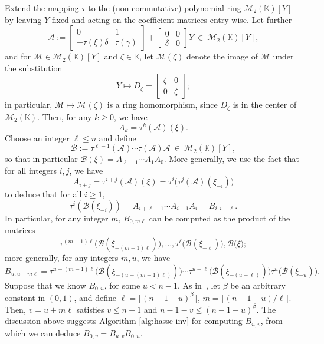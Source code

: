 \documentclass[12pt]{article}
\theoremstyle{plain}
\theoremstyle{definition}
\def\K{\ensuremath{\mathbb{K}}}
\begin{document}
Extend the mapping $\tau$ to the (non-commutative) polynomial ring
$\mathscr{M}_2(\K)[Y]$ by leaving $Y$ fixed and acting on the
coefficient matrices entry-wise.  Let further
\[
\mathcal{A} := 
\begin{bmatrix}
0 & 1 \\
-\tau(\xi)\delta & \tau(\gamma)
\end{bmatrix}
+
\begin{bmatrix}
0 & 0 \\
\delta & 0
\end{bmatrix} Y ~ \in ~ \mathscr{M}_2(\K)[Y],
\]
and for $\mathcal{M} \in \mathscr{M}_2(\K)[Y]$ and $\zeta \in \K$, let $\mathcal{M}(\zeta)$ 
denote the image of $\mathcal{M}$ under the substitution 
\[Y \longmapsto 
D_\zeta=\begin{bmatrix}
	\zeta & 0 \\
	0 & \zeta
\end{bmatrix};
\]
in particular, $\mathcal{M} \mapsto \mathcal{M}(\zeta)$ is a ring
homomorphism, since $D_\zeta$ is in the center of $\mathscr{M}_2(\K)$.
Then, for any $k \ge 0$, we have $$A_k = \tau^{k}(\mathcal{A})(\xi).$$
Choose an integer $\ell \le n$ and define
\[\mathcal{B} := \tau^{\ell-1}(\mathcal{A}) \cdots \tau(\mathcal{A}) \mathcal{A}  ~ \in ~ \mathscr{M}_2(\K)[Y],\]
so that in particular
$\mathcal{B}(\xi) = A_{\ell-1} \cdots A_1 A_0.$ More generally, 
we use the fact that for all integers $i, j$, we have
\[A_{i + j} = \tau^{i + j}(\mathcal{A})(\xi) = \tau^i\big(\tau^j(\mathcal{A})( 
\xi_{-i})\big)\]
to deduce that  for all $i \ge 1$,
\[\tau^{i}(\mathcal{B}( \xi_{-i})) = A_{i + \ell-1} \cdots A_{i + 1}A_{i} = B_{i,i+\ell}.\]
In particular, for any integer $m$, $B_{0,m\ell}$ can be computed as the product of the  matrices
\[
\tau^{(m-1) \ell}\big(\mathcal{B} ( \xi_{-(m-1)\ell} ) \big), \dots, 
\tau^{\ell}\big(\mathcal{B} ( \xi_{-\ell}) \big), \mathcal{B} \big(\xi\big);
\]
more generally, for any integers $m,u$, we have 
\[
B_{u,u+m\ell}=
\tau^{u+(m-1) \ell}\big(\mathcal{B} ( \xi_{-(u+(m-1) \ell)}) \big) \cdots
\tau^{u+\ell}\big(\mathcal{B} ( \xi_{-(u+\ell)}) \big)
\tau^{u}\big(\mathcal{B} ( \xi_{-u}) \big).
\]
Suppose that we know $B_{0,u}$, for some $u < n-1$. As in~\cite{ks},
let $\beta$ be an arbitrary constant in $(0,1)$, and define $\ell =
\lceil (n-1-u)^\beta \rceil$, $m = \lfloor (n-1-u) / \ell
\rfloor$. Then, $v=u+m\ell$ satisfies $v \le n-1$ and $n-1-v \le
(n-1-u)^\beta$.  The discussion above suggests Algorithm
\ref{alg:hasse-inv} for computing $B_{u,v}$, from which we can
deduce $B_{0,v} = B_{u,v}B_{0,u}$.
\end{document}
